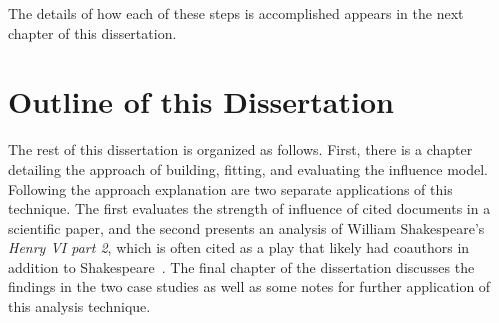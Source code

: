 \documentclass[../dissertation.tex]{subfiles}
\begin{document}
The details of how each of these steps is accomplished appears in the
next chapter of this dissertation.

\section{Outline of this Dissertation}
The rest of this dissertation is organized as follows.  First, there
is a chapter detailing the approach of building, fitting, and
evaluating the influence model.  Following the approach explanation
are two separate applications of this technique.  The first evaluates
the strength of influence of cited documents in a scientific paper,
and the second presents an analysis of William Shakespeare's {\em
  Henry VI part 2}, which is often cited as a play that likely had
coauthors in addition to Shakespeare~\cite{burrows2017}.  The final
chapter of the dissertation discusses the findings in the two case
studies as well as some notes for further application of this analysis
technique.



\end{document}
